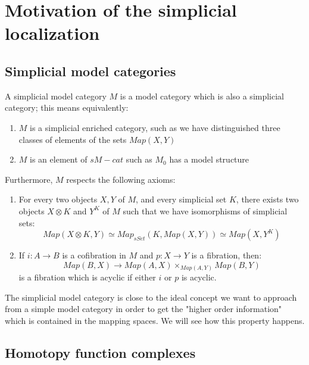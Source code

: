 \section{Motivation of the simplicial localization}

\subsection{Simplicial model categories}

\begin{defin}
A simplicial model category $M$ is a model category which is also a simplicial category; this means equivalently:
\begin{enumerate}
\item $M$ is a simplicial enriched category, such as we have distinguished three classes of elements of the sets $Map(X,Y)$
\item $M$ is an element of $sM-cat$ such as $M_0$ has a model structure
\end{enumerate}
Furthermore, $M$ respects the following axioms:
\begin{enumerate}
\item For every two objects $X, Y$ of $M$, and every simplicial set $K$, there exists two objects $X\otimes K$ and $Y^K$ of $M$ such that we have isomorphisms of simplicial sets:
\begin{equation}
Map(X\otimes K, Y) \simeq Map_{sSet}(K, Map(X,Y)) \simeq Map(X, Y^K)
\end{equation}
\item If $i: A\rightarrow B$ is a cofibration in $M$ and $p:X \rightarrow Y$ is a fibration, then:
\begin{equation}
Map(B,X) \rightarrow Map(A,X) \times_{Map(A,Y)} Map(B,Y)
\end{equation}
is a fibration which is acyclic if either $i$ or $p$ is acyclic.
\end{enumerate}
\end{defin}

The simplicial model category is close to the ideal concept we want to approach from a simple model category in order to get the "higher order information" which is contained in the mapping spaces. We will see how this property happens.

\subsection{Homotopy function complexes}

